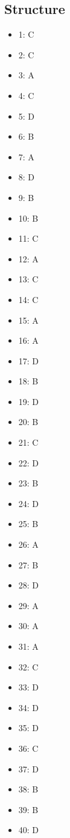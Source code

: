 \documentclass[12pt]{article}
\begin{document}
\subsection*{Structure}
\begin{itemize}[leftmargin=*]
\item 1: C
\item 2: C
\item 3: A
\item 4: C
\item 5: D
\item 6: B
\item 7: A
\item 8: D
\item 9: B
\item 10: B
\item 11: C
\item 12: A
\item 13: C
\item 14: C
\item 15: A
\item 16: A
\item 17: D
\item 18: B
\item 19: D
\item 20: B
\item 21: C
\item 22: D
\item 23: B
\item 24: D
\item 25: B
\item 26: A
\item 27: B
\item 28: D
\item 29: A
\item 30: A
\item 31: A
\item 32: C
\item 33: D
\item 34: D
\item 35: D
\item 36: C
\item 37: D
\item 38: B
\item 39: B
\item 40: D
\end{itemize}
\end{document}
